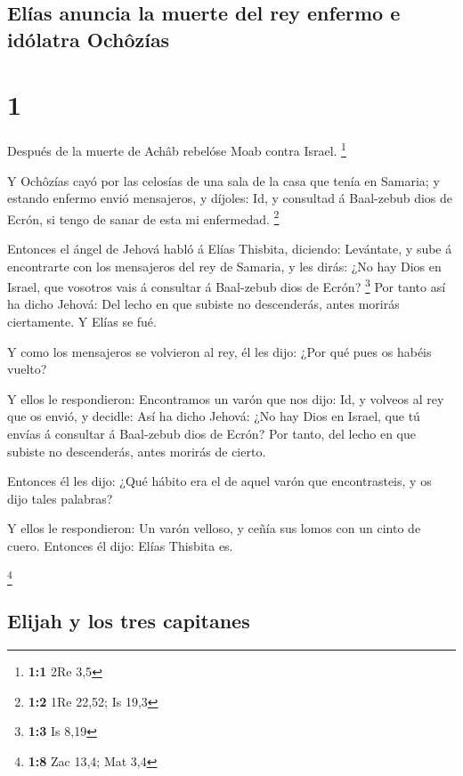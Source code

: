 \hypertarget{eluxedas-anuncia-la-muerte-del-rey-enfermo-e-iduxf3latra-ochuxf4zuxedas}{%
\subsection{Elías anuncia la muerte del rey enfermo e idólatra
Ochôzías}\label{eluxedas-anuncia-la-muerte-del-rey-enfermo-e-iduxf3latra-ochuxf4zuxedas}}

\hypertarget{section}{%
\section{1}\label{section}}

 Después de la muerte de Achâb rebelóse Moab contra
Israel. \footnote{\textbf{1:1} 2Re 3,5}

 Y Ochôzías cayó por las celosías de una sala de la casa
que tenía en Samaria; y estando enfermo envió mensajeros, y díjoles: Id,
y consultad á Baal-zebub dios de Ecrón, si tengo de sanar de esta mi
enfermedad. \footnote{\textbf{1:2} 1Re 22,52; Is 19,3}

 Entonces el ángel de Jehová habló á Elías Thisbita,
diciendo: Levántate, y sube á encontrarte con los mensajeros del rey de
Samaria, y les dirás: ¿No hay Dios en Israel, que vosotros vais á
consultar á Baal-zebub dios de Ecrón? \footnote{\textbf{1:3} Is 8,19}
 Por tanto así ha dicho Jehová: Del lecho en que subiste
no descenderás, antes morirás ciertamente. Y Elías se fué.

 Y como los mensajeros se volvieron al rey, él les dijo:
¿Por qué pues os habéis vuelto?

 Y ellos le respondieron: Encontramos un varón que nos
dijo: Id, y volveos al rey que os envió, y decidle: Así ha dicho Jehová:
¿No hay Dios en Israel, que tú envías á consultar á Baal-zebub dios de
Ecrón? Por tanto, del lecho en que subiste no descenderás, antes morirás
de cierto.

 Entonces él les dijo: ¿Qué hábito era el de aquel varón
que encontrasteis, y os dijo tales palabras?

 Y ellos le respondieron: Un varón velloso, y ceñía sus
lomos con un cinto de cuero. Entonces él dijo: Elías Thisbita es.

\footnote{\textbf{1:8} Zac 13,4; Mat 3,4}

\hypertarget{elijah-y-los-tres-capitanes}{%
\subsection{Elijah y los tres
capitanes}\label{elijah-y-los-tres-capitanes}}

